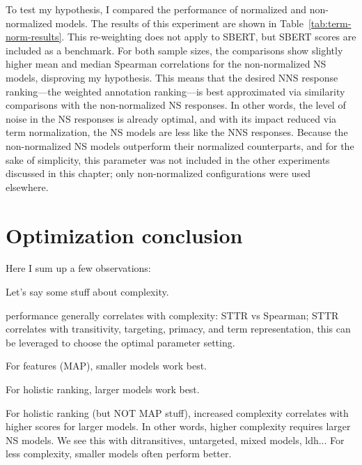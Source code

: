 To test my hypothesis, I compared the performance of normalized and non-normalized models. 
The results of this experiment are shown in Table~\ref{tab:term-norm-results}. This re-weighting does not apply to SBERT, but SBERT scores are included as a benchmark. For both sample sizes, the comparisons show slightly higher mean and median Spearman correlations for the non-normalized NS models, disproving my hypothesis. This means that the desired NNS response ranking---the weighted annotation ranking---is best approximated via similarity comparisons with the non-normalized NS responses. In other words, the level of noise in the NS responses is already optimal, and with its impact reduced via term normalization, the NS models are less like the NNS responses. Because the non-normalized NS models outperform their normalized counterparts, and for the sake of simplicity, this parameter was not included in the other experiments discussed in this chapter; only non-normalized configurations were used elsewhere.


\section{Optimization conclusion}
\label{sec:optimization-conclusion}
Here I sum up a few observations:

Let's say some stuff about complexity.

performance generally correlates with complexity: STTR vs Spearman; STTR correlates with transitivity, targeting, primacy, and term representation, this can be leveraged to choose the optimal parameter setting.

For features (MAP), smaller models work best.

For holistic ranking, larger models work best.

For holistic ranking (but NOT MAP stuff), increased complexity correlates with higher scores for larger models. In other words, higher complexity requires larger NS models. We see this with ditransitives, untargeted, mixed models, ldh... For less complexity, smaller models often perform better.

